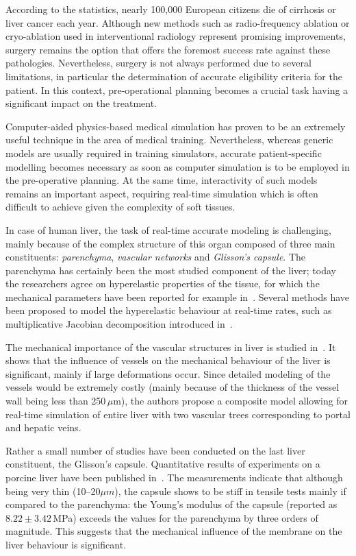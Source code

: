 \documentclass{llncs}
\begin{document}
According to the statistics, nearly 100,000 European citizens die of cirrhosis or liver cancer each year. 
Although new methods such as radio-frequency ablation or cryo-ablation used in interventional radiology 
represent promising improvements, surgery remains the option that offers the foremost success rate against these pathologies. 
Nevertheless, surgery is not always performed due to several limitations, in particular the determination 
of accurate eligibility criteria for the patient. 
In this context, pre-operational planning becomes a crucial task having a significant impact on the treatment. 

Computer-aided physics-based medical simulation has proven to be an extremely useful technique in the area of medical training. 
Nevertheless, whereas generic models are usually required in training simulators, accurate patient-specific modelling
becomes necessary as soon as computer simulation is to be employed in the pre-operative planning. At the same time, 
interactivity of such models  remains an important aspect, requiring real-time simulation which is often difficult to 
achieve given the complexity of soft tissues. 

In case of human liver, the task of real-time accurate modeling is challenging, mainly because of the complex structure 
of this organ composed of three main constituents: \emph{parenchyma}, \emph{vascular networks} and \emph{Glisson's capsule}.
The parenchyma has certainly been the most studied component of the liver; today the researchers agree on hyperelastic 
properties of the tissue, for which the mechanical parameters have been reported for example in~\cite{Kerdok2006,Gao2009}. 
Several methods have been proposed to model the hyperelastic behaviour at real-time rates, such as multiplicative Jacobian decomposition
introduced in~\cite{Marchesseau2010}.

The mechanical importance of the vascular structures in liver is studied in~\cite{Peterlik2012}. It shows that the 
influence of vessels on the mechanical behaviour of the liver is significant, mainly if large deformations occur. 
Since detailed modeling of the vessels would be extremely costly (mainly because of the thickness of the vessel wall 
being less than 250\,{$\mu$}m), the authors propose a composite model allowing for real-time simulation of entire liver
with two vascular trees corresponding to portal and hepatic veins.

Rather a small number of studies have been conducted on the last liver constituent, the  Glisson's capsule.
Quantitative results of experiments on a porcine liver have been published in~\cite{Umale2013}. The measurements indicate that although being very 
thin (10--20$\mu m$), the capsule shows to be stiff in tensile tests mainly if compared to the parenchyma: the Young's modulus of the capsule (reported as $8.22\pm3.42$\,MPa) exceeds the values for the parenchyma by three orders of magnitude.
This suggests that the mechanical influence of the membrane on the liver behaviour is significant.
\end{document}
